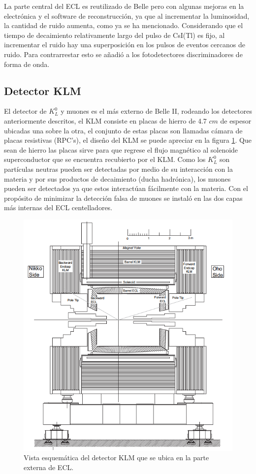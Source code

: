 La parte central del ECL es reutilizado de Belle pero con algunas mejoras en la electrónica y el software de reconstrucción, ya que al incrementar la luminosidad, la cantidad de ruido aumenta, como ya se ha mencionado. Considerando que el tiempo de decaimiento relativamente largo del pulso de CsI(Tl) es fijo, al incrementar el ruido hay una superposición en los pulsos de eventos cercanos de ruido. Para contrarrestar esto se añadió a los fotodetectores discriminadores de forma de onda.

\subsection{Detector KLM}

El detector de \(K_{L}^{0}\) y muones es el más externo de Belle II, rodeando los detectores anteriormente descritos, el KLM consiste en placas de hierro de 4.7 \(cm\) de espesor ubicadas una sobre la otra, el conjunto de estas placas son llamadas cámara de placas resistivas (RPC's), el diseño del KLM se puede apreciar en la figura \ref{fig:klm}. Que sean de hierro las placas sirve para que regrese el flujo magnético al solenoide superconductor que se encuentra recubierto por el KLM. Como los \(K_{L}^0\) son partículas neutras pueden ser detectadas por medio de su interacción con la materia y por sus productos de decaimiento (ducha hadrónica), los muones pueden ser detectados ya que estos interactúan fácilmente con la materia. Con el propósito de minimizar la detección falsa de muones se instaló en las dos capas más internas del ECL centelladores.

\begin{figure}[h]
    \centering
    \includegraphics[scale=.5]{Images/KLM.png}
    \caption{\small Vista esquemática del detector KLM que se ubica en la parte externa de ECL.}
    \label{fig:klm}
\end{figure}

